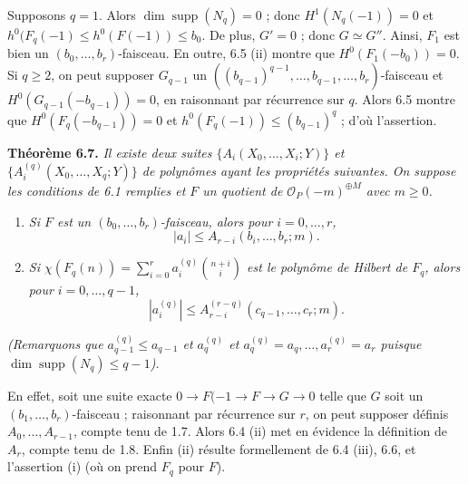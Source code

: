 Supposons $q=1$. Alors $\dim\operatorname{supp}(N_q)=0$ ; donc $H^1(N_q(-1))=0$ et $h^0(F_q(-1)\le h^0(F(-1))\le b_0$. De plus, $G'=0$ ; donc $G\simeq G''$. Ainsi, $F_1$ est bien un $(b_0,\ldots,b_r)$-faisceau. En outre, 6.5 (ii) montre que $H^0(F_1(-b_0))=0$. Si $q\ge2$, on peut supposer $G_{q-1}$ un $((b_{q-1})^{q-1},\ldots,b_{q-1},\ldots,b_r)$-faisceau et $H^0(G_{q-1}(-b_{q-1}))=0$, en raisonnant par r\'ecurrence sur $q$. Alors 6.5 montre que $H^0(F_q(-b_{q-1}))=0$ et $h^0(F_q(-1))\le (b_{q-1})^q$ ; d'o\`u l'assertion.

\textbf{Th\'eor\`eme 6.7.} \emph{Il existe deux suites $\{A_i(X_0,\ldots,X_i;Y)\}$ et $\{A_i^{(q)}(X_0,\ldots,X_q;Y)\}$ de polyn\^omes ayant les propri\'et\'es suivantes. On suppose les conditions de 6.1 remplies et $F$ un quotient de $\mathcal O_P(-m)^{\oplus M}$ avec $m\ge0$.}
\begin{enumerate}[label=(\roman*)]
\item \emph{Si $F$ est un $(b_0,\ldots,b_r)$-faisceau, alors pour $i=0,\ldots,r$,}
\[
   |a_i|\le A_{r-i}(b_i,\ldots,b_r;m).
\]
\item \emph{Si $\chi(F_q(n))=\sum_{i=0}^{r} a_i^{(q)}\binom{n+i}{i}$ est le polyn\^ome de Hilbert de $F_q$, alors pour $i=0,\ldots,q-1$,}
\[
   |a_i^{(q)}|\le A_{r-i}^{(r-q)}(c_{q-1},\ldots,c_r;m).
\]
\end{enumerate}
\emph{(Remarquons que $a_{q-1}^{(q)}\le a_{q-1}$ et $a_q^{(q)}$ et $a_q^{(q)}=a_q,\ldots,a_r^{(q)}=a_r$ puisque $\dim\operatorname{supp}(N_q)\le q-1$).}

En effet, soit une suite exacte $0\to F(-1\to F\to G\to0$ telle que $G$ soit un $(b_1,\ldots,b_r)$-faisceau ; raisonnant par r\'ecurrence sur $r$, on peut supposer d\'efinis $A_0,\ldots,A_{r-1}$, compte tenu de 1.7. Alors 6.4 (ii) met en \'evidence la d\'efinition de $A_r$, compte tenu de 1.8. Enfin (ii) r\'esulte formellement de 6.4 (iii), 6.6, et l'assertion (i) (o\`u on prend $F_q$ pour $F$).

